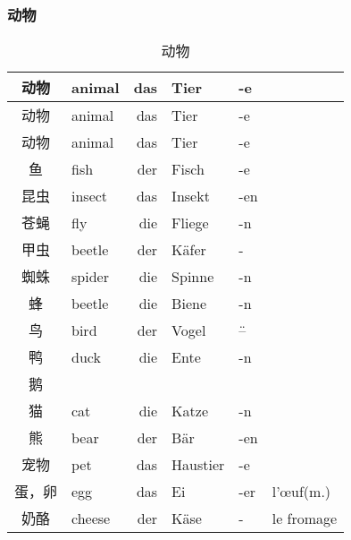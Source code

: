 \documentclass[12pt,A4paper,oneside,reqno]{amsart}
\numberwithin{equation}{section}
\theoremstyle{plain}
\theoremstyle{plain}
\theoremstyle{plain}
\numberwithin{equation}{section}
\theoremstyle{remark}
\begin{document}
\subsubsection{动物}\hspace{1cm}
\begin{longtable}{c|l|rll|l}
	\hline
动物	&	animal	&	das	&	Tier	&	-e	&		\\

	\hline
	\endhead
	\hline
动物	&	animal	&	das	&	Tier	&	-e	&		\\

	\hline
	\endfirsthead	
	\hline
	\endfoot
	\hline	
	\caption{动物}
	\endlastfoot				
动物	&	animal	&	das	&	Tier	&	-e	&		\\
鱼	&	fish	&	der	&	Fisch	&	-e	&		\\
昆虫	&	insect	&	das	&	Insekt	&	-en	&		\\
苍蝇	&	fly	&	die	&	Fliege	&	-n	&		\\
甲虫	&	beetle	&	der	&	K\"{a}fer	&	-	&		\\
蜘蛛	&	spider	&	die	&	Spinne	&	-n	&		\\
蜂	&	beetle	&	die	&	Biene	&	-n	&		\\
鸟	&	bird	&	der	&	Vogel	&	\"{--}	&		\\
鸭	&	duck	&	die	&	Ente	&	-n	&		\\
鹅	&		&		&		&		&		\\
猫	&	cat	&	die	&	Katze	&	-n	&		\\
熊	&	bear	&	der	&	B\"{a}r	&	-en	&		\\
宠物	&	pet	&	das	&	Haustier	&	-e	&		\\
蛋，卵 	&	egg	&	das 	&	Ei	&	-er	&	l'\oe uf(m.)	\\
奶酪	&	cheese	&	der	&	K\"{a}se	&	-	&	le fromage	\\

	
	
\end{longtable}
\end{document}
